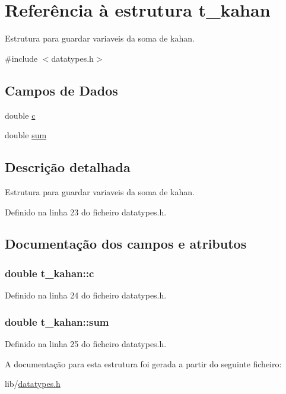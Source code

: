 \hypertarget{structt__kahan}{}\section{Referência à estrutura t\+\_\+kahan}
\label{structt__kahan}


Estrutura para guardar variaveis da soma de kahan.  




{\ttfamily \#include $<$datatypes.\+h$>$}

\subsection*{Campos de Dados}
\begin{DoxyCompactItemize}
\item 
double \hyperlink{structt__kahan_aa5dad65ae9dcd08a440efda00a391d4c}{c}
\item 
double \hyperlink{structt__kahan_a3470cc5d124b476e3f2e8a043aa6a6c6}{sum}
\end{DoxyCompactItemize}


\subsection{Descrição detalhada}
Estrutura para guardar variaveis da soma de kahan. 

Definido na linha 23 do ficheiro datatypes.\+h.



\subsection{Documentação dos campos e atributos}
\subsubsection[{\texorpdfstring{c}{c}}]{\setlength{\rightskip}{0pt plus 5cm}double t\+\_\+kahan\+::c}\hypertarget{structt__kahan_aa5dad65ae9dcd08a440efda00a391d4c}{}\label{structt__kahan_aa5dad65ae9dcd08a440efda00a391d4c}


Definido na linha 24 do ficheiro datatypes.\+h.

\subsubsection[{\texorpdfstring{sum}{sum}}]{\setlength{\rightskip}{0pt plus 5cm}double t\+\_\+kahan\+::sum}\hypertarget{structt__kahan_a3470cc5d124b476e3f2e8a043aa6a6c6}{}\label{structt__kahan_a3470cc5d124b476e3f2e8a043aa6a6c6}


Definido na linha 25 do ficheiro datatypes.\+h.



A documentação para esta estrutura foi gerada a partir do seguinte ficheiro\+:\begin{DoxyCompactItemize}
\item 
lib/\hyperlink{datatypes_8h}{datatypes.\+h}\end{DoxyCompactItemize}
